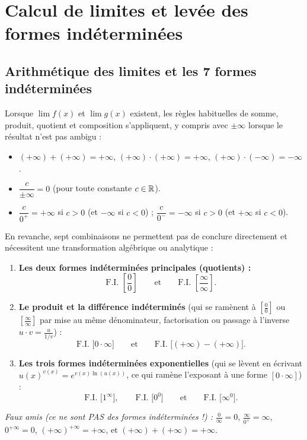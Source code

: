 \section{Calcul de limites et levée des formes indéterminées}

\subsection{Arithmétique des limites et les 7 formes indéterminées}

Lorsque $\lim f(x)$ et $\lim g(x)$ existent, les règles habituelles de somme, produit, quotient et composition s'appliquent, y compris avec $\pm\infty$ lorsque le résultat n'est pas ambigu :
\begin{itemize}
    \item $(+\infty) + (+\infty) = +\infty$, \quad $(+\infty) \cdot (+\infty) = +\infty$, \quad $(+\infty) \cdot (-\infty) = -\infty$.
    \item $\dfrac{c}{\pm\infty} = 0$ (pour toute constante $c \in \mathbb{R}$).
    \item $\dfrac{c}{0^+} = +\infty$ si $c > 0$ (et $-\infty$ si $c < 0$) ; \quad $\dfrac{c}{0^-} = -\infty$ si $c > 0$ (et $+\infty$ si $c < 0$).
\end{itemize}

En revanche, sept combinaisons ne permettent pas de conclure directement et nécessitent une transformation algébrique ou analytique :

\begin{attention}
\begin{enumerate}
    \item \textbf{Les deux formes indéterminées principales (quotients) :}
    \[
        \boxed{\text{F.I. } \left[\frac{0}{0}\right]} \qquad \text{et} \qquad \boxed{\text{F.I. } \left[\frac{\infty}{\infty}\right]}.
    \]
    \item \textbf{Le produit et la différence indéterminés} (qui se ramènent à $\left[\frac{0}{0}\right]$ ou $\left[\frac{\infty}{\infty}\right]$ par mise au même dénominateur, factorisation ou passage à l'inverse $u \cdot v = \frac{u}{1/v}$) :
    \[
        \boxed{\text{F.I. } \bigl[0 \cdot \infty\bigr]} \qquad \text{et} \qquad \boxed{\text{F.I. } \bigl[(+\infty) - (+\infty)\bigr]}.
    \]
    \item \textbf{Les trois formes indéterminées exponentielles} (qui se lèvent en écrivant $u(x)^{v(x)} = e^{v(x)\ln(u(x))}$, ce qui ramène l'exposant à une forme $[0 \cdot \infty]$) :
    \[
        \boxed{\text{F.I. } \bigl[1^\infty\bigr]}, \qquad \boxed{\text{F.I. } \bigl[0^0\bigr]} \qquad \text{et} \qquad \boxed{\text{F.I. } \bigl[\infty^0\bigr]}.
    \]
\end{enumerate}
\emph{Faux amis (ce ne sont PAS des formes indéterminées !) :} $\frac{0}{\infty} = 0$, $\frac{\infty}{0^+} = \infty$, $0^{+\infty} = 0$, $(+\infty)^{+\infty} = +\infty$, et $(+\infty) + (+\infty) = +\infty$.
\end{attention}

